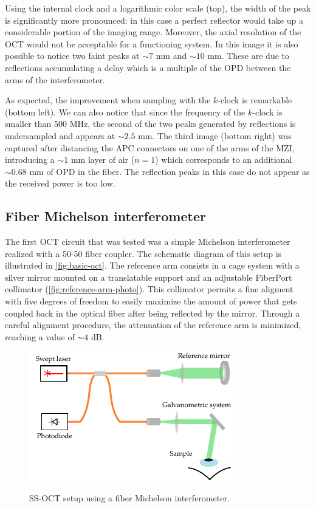 Using the internal clock and a logarithmic color scale (top), the width of the peak is significantly more pronounced: in this case a perfect reflector would take up a considerable portion of the imaging range. Moreover, the axial resolution of the OCT would not be acceptable for a functioning system. In this image it is also possible to notice two faint peaks at $\sim 7$ mm and $\sim 10$ mm. These are due to reflections accumulating a delay which is a multiple of the OPD between the arms of the interferometer. 

As expected, the improvement when sampling with the $k$-clock is remarkable (bottom left). We can also notice that since the frequency of the $k$-clock is smaller than 500 MHz, the second of the two peaks generated by reflections is undersampled and appears at $\sim 2.5$ mm. The third image (bottom right) was captured after distancing the APC connectors on one of the arms of the \ac{MZI}, introducing a $\sim 1$ mm layer of air ($n=1$) which corresponds to an additional $\sim 0.68$ mm of OPD in the fiber. The reflection peaks in this case do not appear as the received power is too low. 


\subsection{Fiber Michelson interferometer}

The first OCT circuit that was tested was a simple Michelson interferometer realized with a 50-50 fiber coupler. The schematic diagram of this setup is illustrated in \autoref{fig:basic-oct}. The reference arm consists in a cage system with a silver mirror mounted on a translatable support and an adjustable FiberPort collimator (\autoref{fig:reference-arm-photo}). This collimator permits a fine aligment with five degrees of freedom to easily maximize the amount of power that gets coupled back in the optical fiber after being reflected by the mirror. Through a careful alignment procedure, the attenuation of the reference arm is minimized, reaching a value of $\sim 4$ dB. 


\begin{figure}[bth]
	\myfloatalign
	{\includegraphics[width=0.8\linewidth]{gfx/setup-diagrams/basic-oct.pdf}}
	\caption{SS-OCT setup using a fiber Michelson interferometer.}\label{fig:basic-oct}
\end{figure}


